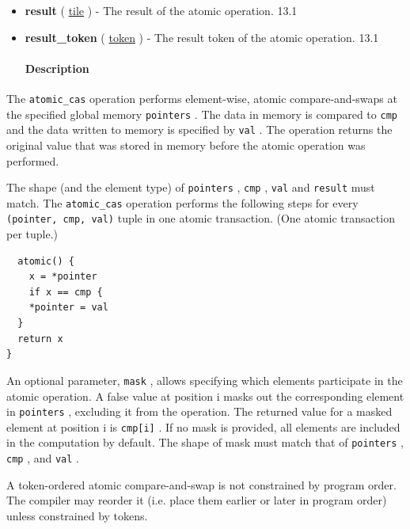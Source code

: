 \documentclass{article}
\begin{document}
\begin{itemize}
\paragraph{Results}

\item \textbf{result} ( \href{https://docs.nvidia.com/cuda/tile-ir/latest/sections/types.html#type-tile}{tile} ) - The result of the atomic operation. 13.1
\item \textbf{result\_token} ( \href{https://docs.nvidia.com/cuda/tile-ir/latest/sections/operations.html#type-token}{token} ) - The result token of the atomic operation. 13.1


\paragraph{Description}

\end{itemize}
The \texttt{atomic\_cas} operation performs element-wise, atomic compare-and-swaps at the specified global memory \texttt{pointers} . The data in memory is compared to \texttt{cmp} and the data written to memory is specified by \texttt{val} . The operation returns the original value that was stored in memory before the atomic operation was performed.


The shape (and the element type) of \texttt{pointers} , \texttt{cmp} , \texttt{val} and \texttt{result} must match. The \texttt{atomic\_cas} operation performs the following steps for every \texttt{(pointer, cmp, val)} tuple in one atomic transaction. (One atomic transaction per tuple.)


\begin{lstlisting}
  atomic() {
    x = *pointer
    if x == cmp {
    *pointer = val
  }
  return x
}
\end{lstlisting}

An optional parameter, \texttt{mask} , allows specifying which elements participate in the atomic operation. A false value at position i masks out the corresponding element in \texttt{pointers} , excluding it from the operation. The returned value for a masked element at position i is \texttt{cmp[i]} . If no mask is provided, all elements are included in the computation by default. The shape of mask must match that of \texttt{pointers} , \texttt{cmp} , and \texttt{val} .


A token-ordered atomic compare-and-swap is not constrained by program order. The compiler may reorder it (i.e. place them earlier or later in program order) unless constrained by tokens.
\end{document}
